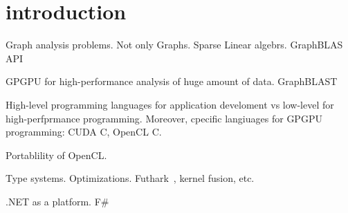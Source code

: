 \section{introduction}

Graph analysis problems. Not only Graphs. Sparse Linear algebrs. GraphBLAS API

GPGPU for high-performance analysis of huge amount of data. 
GraphBLAST~\cite{!!!} 

High-level programming languages for application develoment vs low-level for high-perfprmance programming.
Moreover, cpecific langiuages for GPGPU programming: CUDA C, OpenCL C.

Portablility of OpenCL.

Type systems. Optimizations. Futhark~\cite{Henriksen:2017:FPF:3062341.3062354}, kernel fusion, etc. 

.NET as a platform. F\#